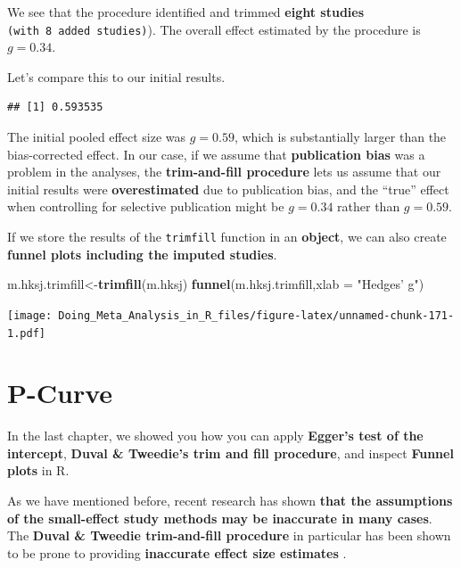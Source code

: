 \documentclass[]{book}
\newenvironment{Shaded}{\begin{snugshade}}{\end{snugshade}}
\newcommand{\DataTypeTok}[1]{\textcolor[rgb]{0.13,0.29,0.53}{#1}}
\newcommand{\KeywordTok}[1]{\textcolor[rgb]{0.13,0.29,0.53}{\textbf{#1}}}
\newcommand{\NormalTok}[1]{#1}
\newcommand{\OperatorTok}[1]{\textcolor[rgb]{0.81,0.36,0.00}{\textbf{#1}}}
\newcommand{\StringTok}[1]{\textcolor[rgb]{0.31,0.60,0.02}{#1}}
\begin{document}
We see that the procedure identified and trimmed \textbf{eight studies} \texttt{(with\ 8\ added\ studies)}). The overall effect estimated by the procedure is \(g = 0.34\).

Let's compare this to our initial results.

\begin{Shaded}
\end{Shaded}

\begin{verbatim}
## [1] 0.593535
\end{verbatim}

The initial pooled effect size was \(g = 0.59\), which is substantially larger than the bias-corrected effect. In our case, if we assume that \textbf{publication bias} was a problem in the analyses, the \textbf{trim-and-fill procedure} lets us assume that our initial results were \textbf{overestimated} due to publication bias, and the ``true'' effect when controlling for selective publication might be \(g = 0.34\) rather than \(g = 0.59\).

If we store the results of the \texttt{trimfill} function in an \textbf{object}, we can also create \textbf{funnel plots including the imputed studies}.

\begin{Shaded}
\begin{Highlighting}[]
\NormalTok{m.hksj.trimfill<-}\KeywordTok{trimfill}\NormalTok{(m.hksj)}
\KeywordTok{funnel}\NormalTok{(m.hksj.trimfill,}\DataTypeTok{xlab =} \StringTok{"Hedges' g"}\NormalTok{)}
\end{Highlighting}
\end{Shaded}

\texttt{[image: Doing\_Meta\_Analysis\_in\_R\_files/figure-latex/unnamed-chunk-171-1.pdf]}

\hypertarget{pcurve}{%
\section{P-Curve}\label{pcurve}}

In the last chapter, we showed you how you can apply \textbf{Egger's test of the intercept}, \textbf{Duval \& Tweedie's trim and fill procedure}, and inspect \textbf{Funnel plots} in R.

As we have mentioned before, recent research has shown \textbf{that the assumptions of the small-effect study methods may be inaccurate in many cases}. The \textbf{Duval \& Tweedie trim-and-fill procedure} in particular has been shown to be prone to providing \textbf{inaccurate effect size estimates} \citep{simonsohn2014pb}.
\end{document}
